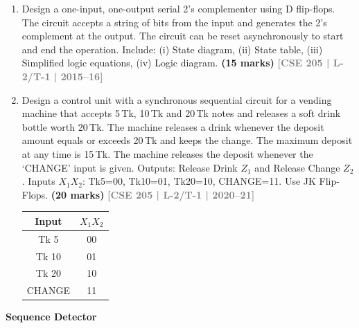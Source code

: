 \documentclass[12pt,a4paper]{article}
\newcommand{\yr}[1]{\hfill\textcolor{gray}{\small\textbf{[#1]}}}
\newcommand{\mk}[1]{\textcolor{orange!70!black}{\small\textbf{(#1 marks)}}}
\newcommand{\subtopic}[2]{%
  \vspace{10pt}
  \noindent\begin{tcolorbox}[colback=#1!8,colframe=#1,boxrule=0.6pt,arc=4pt,
    left=6pt,right=6pt,top=4pt,bottom=4pt]
    \small\bfseries\textcolor{#1}{#2}
  \end{tcolorbox}
  \vspace{2pt}
}
\begin{document}
\begin{enumerate}
\begin{center}
\begin{tikzpicture}
\end{tikzpicture}
\end{center}

\mk{21} \yr{CSE 205 | L-2/T-1 | 2013--14}



\item Design a one-input, one-output serial 2's complementer using D flip-flops. The circuit accepts a string of bits from the input and generates the 2's complement at the output. The circuit can be reset asynchronously to start and end the operation. Include: (i) State diagram, (ii) State table, (iii) Simplified logic equations, (iv) Logic diagram.
\mk{15} \yr{CSE 205 | L-2/T-1 | 2015--16}


\item Design a control unit with a synchronous sequential circuit for a vending machine that accepts 5\,Tk, 10\,Tk and 20\,Tk notes and releases a soft drink bottle worth 20\,Tk. The machine releases a drink whenever the deposit amount equals or exceeds 20\,Tk and keeps the change. The maximum deposit at any time is 15\,Tk. The machine releases the deposit whenever the `CHANGE' input is given. Outputs: Release Drink $Z_1$ and Release Change $Z_2$. Inputs $X_1X_2$: Tk5=00, Tk10=01, Tk20=10, CHANGE=11. Use JK Flip-Flops.
\mk{20} \yr{CSE 205 | L-2/T-1 | 2020--21}

\begin{center}
  \begin{tabular}{|c|c|}
\hline
Input & $X_1X_2$ \\
\hline
Tk 5 & 00 \\
\hline
Tk 10 & 01 \\
\hline
Tk 20 & 10 \\
\hline
CHANGE & 11 \\
\hline
\end{tabular}
\end{center}


\end{enumerate}

\subtopic{cF}{Sequence Detector}
\label{sub:s6-sequence}
\end{document}
